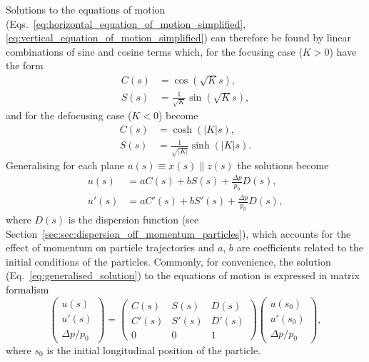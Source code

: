 \documentclass[../main.tex]{subfiles}
\begin{document}
Solutions to the equations of motion (Eqs.~\ref{eq:horizontal_equation_of_motion_simplified}, \ref{eq:vertical_equation_of_motion_simplified}) can therefore be found by linear combinations of sine and cosine terms which, for the focusing case ($K>0$) have the form
\begin{align}
C\left(s\right) &= \cos\left(\sqrt{K}s\right), \nonumber\\
S\left(s\right) &= \frac{1}{\sqrt{K}}\sin\left(\sqrt{K}s\right),
\label{eq:focusing_solution_equation_of_motion}
\end{align}
and for the defocusing case ($K<0$) become
\begin{align}
C\left(s\right) &= \cosh\left(\left|K\right|s\right), \nonumber \\
S\left(s\right) &= \frac{1}{\sqrt{\left|K\right|}}\sinh\left(\left|K\right|s\right).
\label{eq:defocusing_solution_equation_of_motion}    
\end{align}
Generalising for each plane $u\left(s\right)\equiv x\left(s\right) \parallel z\left(s\right)$ the solutions become
\begin{align}
u\left(s\right) &= aC\left(s\right) + bS\left(s\right) + \frac{\Delta p}{p_{0}}D\left(s\right), \nonumber \\
u'\left(s\right) &= aC'\left(s\right) + bS'\left(s\right) + \frac{\Delta p}{p_{0}}D\left(s\right),
\label{eq:generalised_solution}
\end{align}
where $D\left(s\right)$ is the dispersion function (see Section~\ref{sec:sec:dispersion_off_momentum_particles}), which accounts for the effect of momentum on particle trajectories and $a$, $b$ are coefficients related to the initial conditions of the particles. Commonly, for convenience, the solution (Eq.~\ref{eq:generalised_solution}) to the equations of motion is expressed in matrix formalism
\begin{equation}
\begin{pmatrix}
u\left(s\right) \\
u'\left(s\right) \\
\Delta p/p_{0}
\end{pmatrix} = 
\begin{pmatrix}
C\left(s\right) & S\left(s\right) & D\left(s\right) \\
C'\left(s\right) & S'\left(s\right) & D'\left(s\right) \\
0 & 0 & 1
\end{pmatrix}
\begin{pmatrix}
u\left(s_{0}\right) \\
u'\left(s_{0}\right) \\
\Delta p/p_{0}
\end{pmatrix},
\label{eq:general_solution_matrix}    
\end{equation}
where $s_{0}$ is the initial longitudinal position of the particle.
\end{document}
